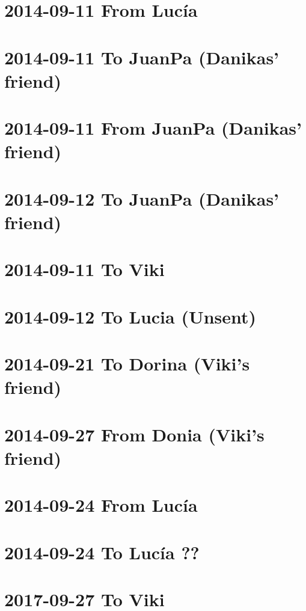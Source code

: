 \documentclass[]{book}
\begin{document}
\hypertarget{from-lucia-6}{%
\section{2014-09-11 From Lucía}\label{from-lucia-6}}

\hypertarget{to-juanpa-danikas-friend}{%
\section{2014-09-11 To JuanPa (Danikas' friend)}\label{to-juanpa-danikas-friend}}

\hypertarget{from-juanpa-danikas-friend}{%
\section{2014-09-11 From JuanPa (Danikas' friend)}\label{from-juanpa-danikas-friend}}

\hypertarget{to-juanpa-danikas-friend-1}{%
\section{2014-09-12 To JuanPa (Danikas' friend)}\label{to-juanpa-danikas-friend-1}}

\hypertarget{to-viki-11}{%
\section{2014-09-11 To Viki}\label{to-viki-11}}

\hypertarget{to-lucia-unsent}{%
\section{2014-09-12 To Lucia (Unsent)}\label{to-lucia-unsent}}

\hypertarget{to-dorina-vikis-friend}{%
\section{2014-09-21 To Dorina (Viki's friend)}\label{to-dorina-vikis-friend}}

\hypertarget{from-donia-vikis-friend}{%
\section{2014-09-27 From Donia (Viki's friend)}\label{from-donia-vikis-friend}}

\hypertarget{from-lucia-7}{%
\section{2014-09-24 From Lucía}\label{from-lucia-7}}

\hypertarget{to-lucia-6}{%
\section{2014-09-24 To Lucía ??}\label{to-lucia-6}}

\hypertarget{to-viki-12}{%
\section{2017-09-27 To Viki}\label{to-viki-12}}


\end{document}
